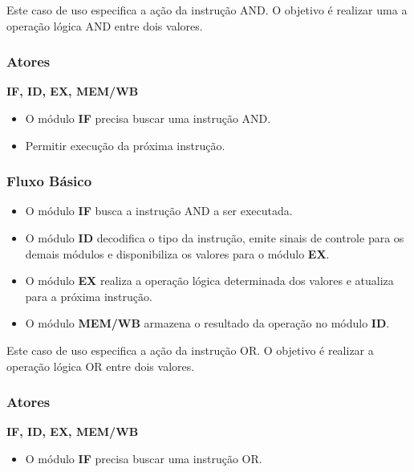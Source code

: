 
Este caso de uso especifica a ação da instrução AND. O objetivo é realizar uma a operação lógica AND entre dois valores.
 
\subsubsection*{Atores}
\textbf{IF, ID, EX, MEM/WB}

\preconditions 
\begin{itemize}
 \item O módulo \textbf{IF} precisa buscar uma instrução AND.
\end{itemize}

\postconditions
\begin{itemize}	
  \item Permitir execução da próxima instrução.
\end{itemize}

\subsubsection*{Fluxo Básico}
\begin{itemize}
\item O módulo \textbf{IF} busca a instrução AND a ser executada.
\item O módulo \textbf{ID} decodifica o tipo da instrução, emite sinais de controle para os demais módulos e disponibiliza os valores para o módulo \textbf{EX}.
\item O módulo \textbf{EX} realiza a operação lógica determinada dos valores e atualiza para a próxima instrução.
\item O módulo \textbf{MEM/WB} armazena o resultado da operação no módulo \textbf{ID}.
\end{itemize}


Este caso de uso especifica a ação da instrução OR. O objetivo é realizar a operação lógica OR entre dois valores.
 
\subsubsection*{Atores}
\textbf{IF, ID, EX, MEM/WB}

\preconditions 
\begin{itemize}
 \item O módulo \textbf{IF} precisa buscar uma instrução OR.
\end{itemize}

